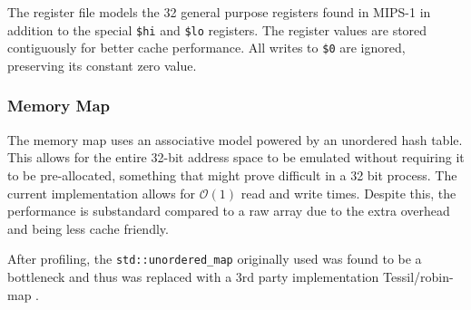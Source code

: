 The register file models the 32 general purpose registers found in MIPS-1 in addition to the special \texttt{\$hi} and \texttt{\$lo} registers. The register values are stored contiguously for better cache performance. All writes to \texttt{\$0} are ignored, preserving its constant zero value.

\subsubsection{Memory Map}
\label{section:interpreter-mem-map}

The memory map uses an associative model powered by an unordered hash table. This allows for the entire 32-bit address space to be emulated without requiring it to be pre-allocated, something that might prove difficult in a 32 bit process. The current implementation allows for $\mathcal{O}(1)$ read and write times. Despite this, the performance is substandard compared to a raw array due to the extra overhead and being less cache friendly.

After profiling, the \texttt{std::unordered\_map} originally used was found to be a bottleneck and thus was replaced with a 3rd party implementation Tessil/robin-map \cite{tessil-map, tessil-benchmark}. 